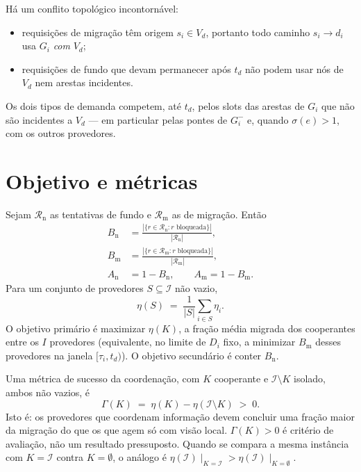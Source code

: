 \documentclass[11pt,a4paper]{article}
\theoremstyle{definition}
\begin{document}
Há um conflito topológico incontornável:
\begin{itemize}[leftmargin=1.4cm]
  \item requisições de migração têm origem $s_i\in V_d$, portanto todo caminho $s_i\to d_i$ usa $G_i$ \emph{com} $V_d$;
  \item requisições de fundo que devam permanecer após $t_d$ não podem usar nós de $V_d$ nem arestas incidentes.
\end{itemize}
Os dois tipos de demanda competem, até $t_d$, pelos slots das arestas de $G_i$ que não são incidentes a $V_d$ --- em particular pelas pontes de $G_i^{-}$ e, quando $\sigma(e)>1$, com os outros provedores.

\section{Objetivo e métricas}

Sejam $\mathcal{R}_{\mathrm{n}}$ as tentativas de fundo e $\mathcal{R}_{\mathrm{m}}$ as de migração. Então
\begin{align}
  B_{\mathrm{n}}
  &=
  \frac{|\{r\in\mathcal{R}_{\mathrm{n}}: r\text{ bloqueada}\}|}{|\mathcal{R}_{\mathrm{n}}|},
  \\
  B_{\mathrm{m}}
  &=
  \frac{|\{r\in\mathcal{R}_{\mathrm{m}}: r\text{ bloqueada}\}|}{|\mathcal{R}_{\mathrm{m}}|},
  \\
  A_{\mathrm{n}} &= 1-B_{\mathrm{n}},
  \qquad
  A_{\mathrm{m}} = 1-B_{\mathrm{m}}.
\end{align}
Para um conjunto de provedores $S\subseteq\mathcal{I}$ não vazio,
\begin{equation}
  \eta(S)
  \;=\;
  \frac{1}{|S|}\sum_{i\in S}\eta_i.
\end{equation}
O objetivo primário é maximizar $\eta(K)$, a fração média migrada dos cooperantes entre os $I$ provedores (equivalente, no limite de $D_i$ fixo, a minimizar $B_{\mathrm{m}}$ desses provedores na janela $[\tau_i,t_d)$).
O objetivo secundário é conter $B_{\mathrm{n}}$.

Uma métrica de sucesso da coordenação, com $K$ cooperante e $\mathcal{I}\setminus K$ isolado, ambos não vazios, é
\begin{equation}
  \label{eq:gap-coop}
  \Gamma(K)
  \;=\;
  \eta(K)-\eta(\mathcal{I}\setminus K)
  \;>\; 0.
\end{equation}
Isto é: os provedores que coordenam informação devem concluir uma fração maior da migração do que os que agem só com visão local.
$\Gamma(K)>0$ é critério de avaliação, não um resultado pressuposto.
Quando se compara a mesma instância com $K=\mathcal{I}$ contra $K=\emptyset$, o análogo é $\eta(\mathcal{I})\mid_{K=\mathcal{I}}>\eta(\mathcal{I})\mid_{K=\emptyset}$.
\end{document}
